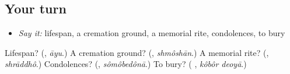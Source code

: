 \subsection*{Your turn}
\begin{itemize}
\raggedright
  \item \emph{Say it:} lifespan, a cremation ground, a memorial rite, condolences, to bury
\end{itemize}

\begin{tcolorbox}[breakable,colback=teal!4,colframe=teal!35!black,title={Before you move on}]
Lifespan? (\textbf{}, \emph{āyu}.) A cremation ground? (\textbf{}, \emph{shmôshān}.) A memorial rite? (\textbf{}, \emph{shrāddhô}.) Condolences? (\textbf{}, \emph{sômôbedônā}.) To bury? (\textbf{ }, \emph{kôbôr deoyā}.)
\end{tcolorbox}
